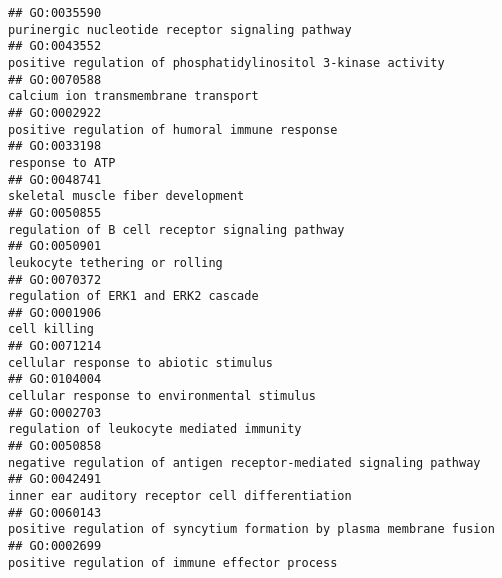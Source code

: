 \documentclass[
]{article}
\begin{document}
\begin{verbatim}
## GO:0035590                                                                                                 purinergic nucleotide receptor signaling pathway
## GO:0043552                                                                                    positive regulation of phosphatidylinositol 3-kinase activity
## GO:0070588                                                                                                              calcium ion transmembrane transport
## GO:0002922                                                                                                   positive regulation of humoral immune response
## GO:0033198                                                                                                                                  response to ATP
## GO:0048741                                                                                                                skeletal muscle fiber development
## GO:0050855                                                                                                  regulation of B cell receptor signaling pathway
## GO:0050901                                                                                                                   leukocyte tethering or rolling
## GO:0070372                                                                                                              regulation of ERK1 and ERK2 cascade
## GO:0001906                                                                                                                                     cell killing
## GO:0071214                                                                                                            cellular response to abiotic stimulus
## GO:0104004                                                                                                      cellular response to environmental stimulus
## GO:0002703                                                                                                        regulation of leukocyte mediated immunity
## GO:0050858                                                                               negative regulation of antigen receptor-mediated signaling pathway
## GO:0042491                                                                                                 inner ear auditory receptor cell differentiation
## GO:0060143                                                                             positive regulation of syncytium formation by plasma membrane fusion
## GO:0002699                                                                                                   positive regulation of immune effector process

\end{verbatim}
\end{document}
